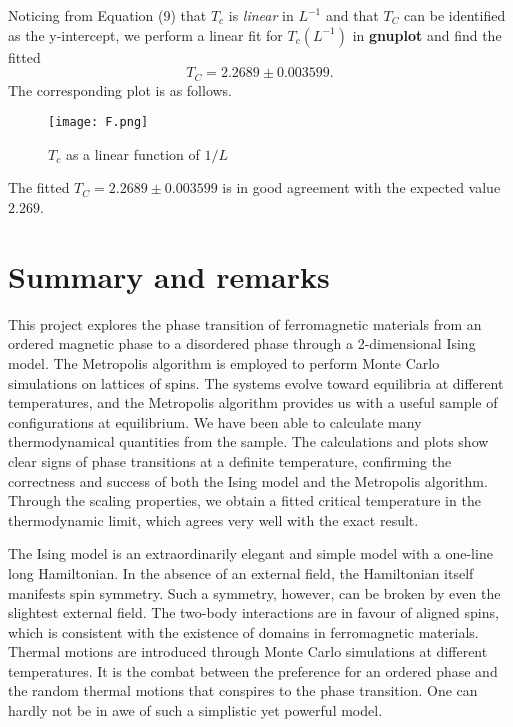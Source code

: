 \documentclass{article}
\begin{document}
Noticing from Equation (9) that $T_c$ is \emph{linear} in $L^{-1}$ and that $T_C$ can be identified as the y-intercept, we perform a linear fit for $T_c(L^{-1})$ in \textbf{gnuplot} and find the fitted
\begin{equation}
T_C = 2.2689 \pm 0.003599.
\end{equation}
The corresponding plot is as follows.

\begin{figure}[H]
\begin{center}
\texttt{[image: F.png]}
\caption{$T_c$ as a linear function of $1/L$}
\end{center}
\end{figure}

The fitted $T_C = 2.2689 \pm 0.003599$ is in good agreement with the expected value $2.269$.

\section{Summary and remarks}
This project explores the phase transition of ferromagnetic materials from an ordered magnetic phase to a disordered phase through a 2-dimensional Ising model. The Metropolis algorithm is employed to perform Monte Carlo simulations on lattices of spins. The systems evolve toward equilibria at different temperatures, and the Metropolis algorithm provides us with a useful sample of configurations at equilibrium. We have been able to calculate many thermodynamical quantities from the sample. The calculations and plots show clear signs of phase transitions at a definite temperature, confirming the correctness and success of both the Ising model and the Metropolis algorithm. Through the scaling properties, we obtain a fitted critical temperature in the thermodynamic limit, which agrees very well with the exact result. 

The Ising model is an extraordinarily elegant and simple model with a one-line long Hamiltonian. In the absence of an external field, the Hamiltonian itself manifests spin symmetry. Such a symmetry, however, can be broken by even the slightest external field. The two-body interactions are in favour of aligned spins, which is consistent with the existence of domains in ferromagnetic materials. Thermal motions are introduced through Monte Carlo simulations at different temperatures. It is the combat between the preference for an ordered phase and the random thermal motions that conspires to the phase transition. One can hardly not be in awe of such a simplistic yet powerful model. 
\end{document}
